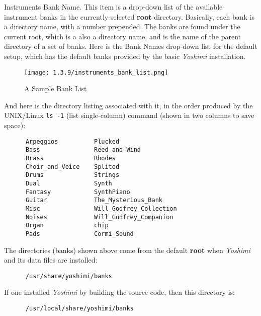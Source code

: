    \setcounter{ItemCounter}{0}      %

   Instruments Bank Name.
   This item is a drop-down list of the available instrument banks in the
   currently-selected \textbf{root} directory.
   Basically, each bank is a directory name, with a number prepended.
   The banks are found under the current root, which is a also a directory
   name, and is the name of the parent directory of a set of banks.
   Here is the Bank Names drop-down list for the default setup, which has the
   default banks provided by the basic \textsl{Yoshimi} installation.

\begin{figure}[H]
   \centering
   \texttt{[image: 1.3.9/instruments\_bank\_list.png]}
   \caption[A Sample Bank List]{A Sample Bank List}
   \label{fig:bank_list}
\end{figure}

   And here is the directory listing associated with it, in the order
   produced by the UNIX/Linux \texttt{ls -1}
   (list single-column) command (shown in
   two columns to save space):

   \begin{verbatim}
      Arpeggios          Plucked
      Bass               Reed_and_Wind
      Brass              Rhodes
      Choir_and_Voice    Splited
      Drums              Strings
      Dual               Synth
      Fantasy            SynthPiano
      Guitar             The_Mysterious_Bank
      Misc               Will_Godfrey_Collection
      Noises             Will_Godfrey_Companion
      Organ              chip
      Pads               Cormi_Sound
   \end{verbatim}

   The directories (banks) shown above come from the default \textbf{root}
   when \textsl{Yoshimi} and its data files are installed:

   \begin{verbatim}
      /usr/share/yoshimi/banks
   \end{verbatim}

   If one installed \textsl{Yoshimi} by building the source code, then
   this directory is:

   \begin{verbatim}
      /usr/local/share/yoshimi/banks
   \end{verbatim}

